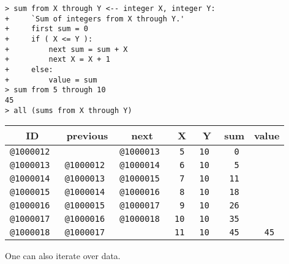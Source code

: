 \documentclass[12pt]{article}
\newenvironment{indpar}[1][0.3in]%
	{\begin{list}{}%
		     {\setlength{\itemsep}{0in}%
		      \setlength{\topsep}{0in}%
		      \setlength{\parsep}{1ex}%
		      \setlength{\labelwidth}{#1}%
		      \setlength{\leftmargin}{#1}%
		      \addtolength{\leftmargin}{\labelsep}}%
	 \item}%
	{\end{list}}
\begin{document}
\begin{indpar}
\verb|> sum from X through Y <-- integer X, integer Y:| \\
\verb|+     `Sum of integers from X through Y.'| \\
\verb|+     first sum = 0| \\
\verb|+     if ( X <= Y ):| \\
\verb|+         next sum = sum + X| \\
\verb|+         next X = X + 1| \\
\verb|+     else:| \\
\verb|+         value = sum| \\
\verb|> sum from 5 through 10| \\
\verb|45| \\
\verb|> all (sums from X through Y)| \\
\begin{tabular}{|r|r|r|r|r|r|r|}
\hline
\multicolumn{1}{|c}{\bf ID} &
\multicolumn{1}{|c}{\bf previous} &
\multicolumn{1}{|c}{\bf next} &
\multicolumn{1}{|c}{\bf X} &
\multicolumn{1}{|c}{\bf Y} &
\multicolumn{1}{|c}{\bf sum} &
\multicolumn{1}{|c|}{\bf value} \\
\hline
\tt @1000012 &              & \tt @1000013
	     & \tt 5	& \tt 10   & \tt 0	& \\
\tt @1000013 & \tt @1000012 & \tt @1000014
	     & \tt 6	& \tt 10   & \tt 5	& \\
\tt @1000014 & \tt @1000013 & \tt @1000015
	     & \tt 7	& \tt 10   & \tt 11	& \\
\tt @1000015 & \tt @1000014 & \tt @1000016
	     & \tt 8	& \tt 10   & \tt 18	& \\
\tt @1000016 & \tt @1000015 & \tt @1000017
	     & \tt 9	& \tt 10   & \tt 26	& \\
\tt @1000017 & \tt @1000016 & \tt @1000018
	     & \tt 10	& \tt 10   & \tt 35	& \\
\tt @1000018 & \tt @1000017 &
	     & \tt 11	& \tt 10   & \tt 45	& \tt 45 \\
\hline
\end{tabular}
\end{indpar}

One can also iterate over data.
\end{document}
